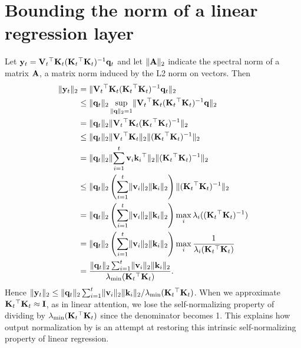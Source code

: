 \documentclass[notitlepage, 11pt]{article}
\begin{document}
\section{Bounding the norm of a linear regression layer}\label{sec:linear-regression-bound}
Let $\mathbf{y}_t = \mathbf{V}_t{}^\top\mathbf{K}_t(\mathbf{K}_t{}^\top\mathbf{K}_t)^{-1} \mathbf{q}_t$ and let $\lVert\mathbf{A}\rVert_2$ indicate the spectral norm of a matrix $\mathbf{A}$, a matrix norm induced by the L2 norm on vectors.
Then
\begin{align}
    \lVert\mathbf{y}_t\rVert_2 &= \lVert\mathbf{V}_t{}^\top\mathbf{K}_t(\mathbf{K}_t{}^\top\mathbf{K}_t)^{-1} \mathbf{q}_t\rVert_2\\
    &\leq \lVert\mathbf{q}_t\rVert_2\sup_{\lVert\mathbf{q}\rVert_2=1} \lVert\mathbf{V}_t{}^\top \mathbf{K}_t (\mathbf{K}_t{}^\top\mathbf{K}_t)^{-1}\mathbf{q}\rVert_2 \\
    & = \lVert\mathbf{q}_t\rVert_2\lVert\mathbf{V}_t{}^\top \mathbf{K}_t (\mathbf{K}_t{}^\top\mathbf{K}_t)^{-1}\rVert_2 \\
    &\leq \lVert\mathbf{q}_t\rVert_2\lVert\mathbf{V}_t{}^\top\mathbf{K}_t\rVert_2\lVert(\mathbf{K}_t{}^\top\mathbf{K}_t)^{-1}\rVert_2 \\
    & = \lVert\mathbf{q}_t\rVert_2\lVert\sum_{i=1}^t \mathbf{v}_i\mathbf{k}_i{}^\top\rVert_2\lVert(\mathbf{K}_t{}^\top\mathbf{K}_t)^{-1}\rVert_2 \\
    &\leq \lVert\mathbf{q}_t\rVert_2\left(\sum_{i=1}^t\lVert \mathbf{v}_i\rVert_2\lVert\mathbf{k}_i\rVert_2\right)\lVert(\mathbf{K}_t{}^\top\mathbf{K}_t)^{-1}\rVert_2 \\
    & = \lVert\mathbf{q}_t\rVert_2\left(\sum_{i=1}^t\lVert \mathbf{v}_i\rVert_2\lVert\mathbf{k}_i\rVert_2\right)\max_i \lambda_i((\mathbf{K}_t{}^\top\mathbf{K}_t)^{-1}) \\
    & = \lVert\mathbf{q}_t\rVert_2\left(\sum_{i=1}^t\lVert \mathbf{v}_i\rVert_2\lVert\mathbf{k}_i\rVert_2\right)\max_i \frac{1}{\lambda_i(\mathbf{K}_t{}^\top\mathbf{K}_t)} \\
    & = \frac{\lVert\mathbf{q}_t\rVert_2\sum_{i=1}^t\lVert \mathbf{v}_i\rVert_2\lVert\mathbf{k}_i\rVert_2}{\lambda_{\text{min}}(\mathbf{K}_t{}^\top\mathbf{K}_t)}.
\end{align}
Hence $\lVert\mathbf{y}_t\rVert_2 \leq \lVert\mathbf{q}_t\rVert_2\sum_{i=1}^t\lVert \mathbf{v}_i\rVert_2\lVert\mathbf{k}_i\rVert_2/\lambda_{\text{min}}(\mathbf{K}_t{}^\top\mathbf{K}_t)$.
When we approximate $\mathbf{K}_t{}^\top\mathbf{K}_t \approx \mathbf{I}$, as in linear attention, we lose the self-normalizing property of dividing by ${\lambda_{\text{min}}(\mathbf{K}_t{}^\top\mathbf{K}_t)}$ since the denominator becomes 1.
This explains how output normalization by \citet{Qin2022DevilLinearTransformer} is an attempt at restoring this intrinsic self-normalizing property of linear regression.
\end{document}
